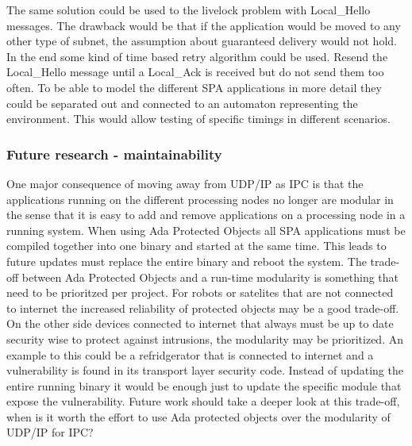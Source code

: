 The same solution could be used to the livelock problem with Local\_Hello
messages. The drawback would be that if the application would be moved to any
other type of subnet, the assumption about guaranteed delivery would not hold.
In the end some kind of time based retry algorithm could be used. Resend the
Local\_Hello message until a Local\_Ack is received but do not send them too
often. To be able to model the different SPA applications in more detail they
could be separated out and connected to an automaton representing the
environment.  This would allow testing of specific timings in different
scenarios.

%

\subsubsection{Future research - maintainability}
One major consequence of moving away from UDP/IP as IPC is that the
applications running on the different processing nodes no longer are modular in
the sense that it is easy to add and remove applications on a processing node
in a running system. When using Ada Protected Objects all SPA applications must
be compiled together into one binary and started at the same time. This leads
to future updates must replace the entire binary and reboot the system. The
trade-off between Ada Protected Objects and a run-time modularity is something
that need to be prioritzed per project. For robots or satelites that are not
connected to internet the increased reliability of protected objects may be a
good trade-off. On the other side devices connected to internet that always
must be up to date security wise to protect against intrusions, the modularity
may be prioritized.  An example to this could be a refridgerator that is
connected to internet and a vulnerability is found in its transport layer
security code. Instead of updating the entire running binary it would be enough
just to update the specific module that expose the vulnerability. Future work
should take a deeper look at this trade-off, when is it worth the effort to use
Ada protected objects over the modularity of UDP/IP for IPC?


